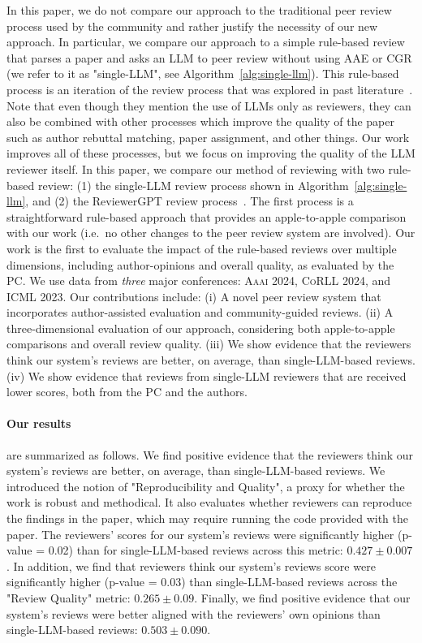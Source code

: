 \documentclass{article} %
\begin{document}
In this paper, we do not compare our approach to the traditional peer review process used by the community and rather justify the necessity of our new approach. In particular, we compare our approach to a simple rule-based review that parses a paper and asks an LLM to peer review without using AAE or CGR (we refer to it as "single-LLM", see Algorithm~\ref{alg:single-llm}). This rule-based process is an iteration of the review process that was explored in past literature~\citep{liu2023reviewergpt}. Note that even though they mention the use of LLMs only as reviewers, they can also be combined with other processes which improve the quality of the paper such as author rebuttal matching, paper assignment, and other things. Our work improves all of these processes, but we focus on improving the quality of the LLM reviewer itself. 
In this paper, we compare our method of reviewing with two rule-based review: (1) the single-LLM review process shown in Algorithm~\ref{alg:single-llm}, and (2) the ReviewerGPT review process~\citep{liu2023reviewergpt}. The first process is a straightforward rule-based approach that provides an apple-to-apple comparison with our work (i.e.\ no other changes to the peer review system are involved). Our work is the first to evaluate the impact of the rule-based reviews over multiple dimensions, including author-opinions and overall quality, as evaluated by the PC. We use data from \textit{three} major conferences: \textsc{Aaai 2024}, \textsc{CoRLL 2024}, and \textsc{ICML 2023}.
Our contributions include: (i) A novel peer review system that incorporates author-assisted evaluation and community-guided reviews. (ii) A three-dimensional evaluation of our approach, considering both apple-to-apple comparisons and overall review quality. (iii) We show evidence that the reviewers think our system's reviews are better, on average, than single-LLM-based reviews. (iv) We show evidence that reviews from single-LLM reviewers that are received lower scores, both from the PC and the authors.

\paragraph{Our results} are summarized as follows. 
We find positive evidence that the reviewers think our system's reviews are better, on average, than single-LLM-based reviews.
We introduced the notion of "Reproducibility and Quality", a proxy for whether the work is robust and methodical.
It also evaluates whether reviewers can reproduce the findings in the paper, which may require running the code provided with the paper.
The reviewers' scores for our system's reviews were significantly higher (p-value = 0.02) than for single-LLM-based reviews across this metric: $0.427 \pm 0.007$.
In addition, we find that reviewers think our system's reviews score were significantly higher (p-value = 0.03) than single-LLM-based reviews across the "Review Quality" metric: $0.265 \pm 0.09$.
Finally, we find positive evidence that our system's reviews were better aligned with the reviewers' own opinions than single-LLM-based reviews: $0.503 \pm 0.090$.
\end{document}
